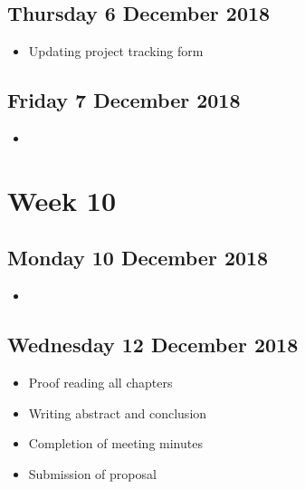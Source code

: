 \subsection*{Thursday 6 December 2018}
\begin{itemize}
	\item Updating project tracking form
\end{itemize}

\subsection*{Friday 7 December 2018}
\begin{itemize}
	\item
\end{itemize}

\section*{Week 10}
\subsection*{Monday 10 December 2018}
\begin{itemize}
	\item
\end{itemize}

\subsection*{Wednesday 12 December 2018}
\begin{itemize}
	\item Proof reading all chapters
	\item Writing abstract and conclusion
	\item Completion of meeting minutes
	\item Submission of proposal
\end{itemize}
